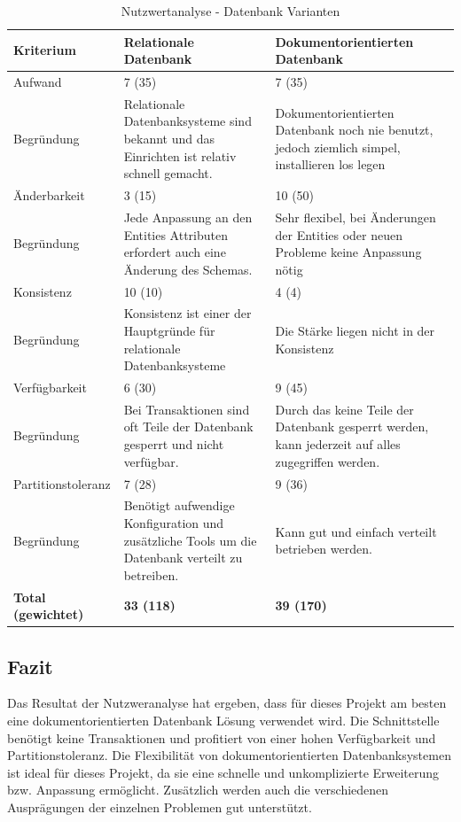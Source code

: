 \begin{table}[ht]
\centering
  \begin{tabular}{>{\columncolor{darkgray}} l | p{5cm} | p{5cm}}
	\hline
	\rowcolor{darkgray}
	Kriterium		&	Relationale Datenbank 	&	Dokumentorientierten Datenbank	\\ \hline
	\rowcolor{gray}
	Aufwand		&	7 (35)		&	7 (35)		\\ \hline
	Begründung		&	Relationale Datenbanksysteme sind bekannt und das Einrichten ist relativ schnell gemacht.			
				&	Dokumentorientierten Datenbank noch nie benutzt, jedoch ziemlich simpel, installieren los legen	\\ \hline
	\rowcolor{gray}
	Änderbarkeit		&	3 (15)		&	10 (50)		\\ \hline
	Begründung		&	Jede Anpassung an den Entities Attributen erfordert auch eine Änderung des Schemas.
				&	Sehr flexibel, bei Änderungen der Entities oder neuen Probleme keine Anpassung nötig\\ \hline
	\rowcolor{gray}
	Konsistenz		&	10 (10)	&	4 (4)		\\ \hline
	Begründung		&	Konsistenz ist einer der Hauptgründe für relationale Datenbanksysteme			
				&	Die Stärke liegen nicht in der Konsistenz\\ \hline
	\rowcolor{gray}
	Verfügbarkeit	&	6 (30)	&	9 (45)		\\ \hline
	Begründung		&	Bei Transaktionen sind oft Teile der Datenbank gesperrt und nicht verfügbar.					
				&	Durch das keine Teile der Datenbank gesperrt werden, kann jederzeit auf alles zugegriffen werden.	\\ \hline
	\rowcolor{gray}
	Partitionstoleranz	&	7 (28)	&	9 (36)		\\ \hline
	Begründung		&	Benötigt aufwendige Konfiguration und zusätzliche Tools um die Datenbank verteilt zu betreiben.
				&	Kann gut und einfach verteilt betrieben werden.		\\ \hline \hline
	\rowcolor{gray}
	\textbf{Total (gewichtet)}	&	\textbf{33 (118)}	&	\textbf{39 (170)}	\\ \hline
  \end{tabular}
   \caption{Nutzwertanalyse - Datenbank Varianten}\label{table:bewertungskriterien}
\end{table}

\FloatBarrier
\subsection{Fazit}\label{architektur_fazit}
Das Resultat der Nutzweranalyse hat ergeben, dass für dieses Projekt am besten eine dokumentorientierten Datenbank Lösung verwendet wird.
Die Schnittstelle benötigt keine Transaktionen und profitiert von einer hohen Verfügbarkeit und Partitionstoleranz. Die Flexibilität
von dokumentorientierten Datenbanksystemen ist ideal für dieses Projekt, da sie eine schnelle und unkomplizierte Erweiterung bzw. Anpassung ermöglicht. Zusätzlich werden 
auch die verschiedenen Ausprägungen der einzelnen Problemen gut unterstützt.

